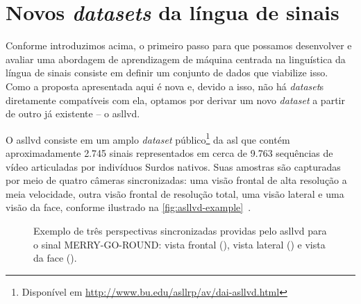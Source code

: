 \section{Novos \textit{datasets} da língua de sinais}
\label{sec:metodologia-datasets}

Conforme introduzimos acima, o primeiro passo para que possamos desenvolver e avaliar uma abordagem de aprendizagem de máquina centrada na linguística da língua de sinais consiste em definir um conjunto de dados que viabilize isso. Como a proposta apresentada aqui é nova e, devido a isso, não há \textit{dataset}s diretamente compatíveis com ela, optamos por derivar um novo \textit{dataset} a partir de outro já existente -- o \acrfull{asllvd}.

O \acrshort{asllvd} consiste em um amplo \textit{dataset} público\footnote{Disponível em \url{http://www.bu.edu/asllrp/av/dai-asllvd.html}} da \acrshort{asl} que contém aproximadamente 2.745 sinais representados em cerca de 9.763 sequências de vídeo articuladas por indivíduos Surdos nativos. Suas amostras são capturadas por meio de quatro câmeras sincronizadas: uma visão frontal de alta resolução a meia velocidade, outra visão frontal de resolução total, uma visão lateral e uma visão da face, conforme ilustrado na \autoref{fig:asllvd-example}~\cite{athitsos-2008-asllvd,neidle-2012-asllvd}.

\begin{figure}[ht!]
    \centering
    \caption{\textmd{Exemplo de três perspectivas sincronizadas providas pelo \acrshort{asllvd} para o sinal MERRY-GO-ROUND: 
    vista frontal (), 
    vista lateral () e 
    vista da face ().}}
    \hfill
    \hfill
    \label{fig:asllvd-example}
\end{figure}


